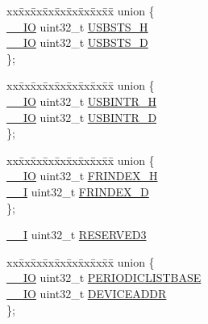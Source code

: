 \begin{DoxyCompactItemize}
\begin{tabbing}
\end{tabbing}\item 
\begin{tabbing}
xx\=xx\=xx\=xx\=xx\=xx\=xx\=xx\=xx\=\kill
union \{\\
\>\hyperlink{core__sc300_8h_aec43007d9998a0a0e01faede4133d6be}{\_\_IO} uint32\_t \hyperlink{struct_l_p_c___u_s_b_h_s___t_abebf0c674a65b6bd7e9d2f4565bcc04c}{USBSTS\_H}\\
\>\hyperlink{core__sc300_8h_aec43007d9998a0a0e01faede4133d6be}{\_\_IO} uint32\_t \hyperlink{struct_l_p_c___u_s_b_h_s___t_a0753b65b5d34850997d44e38edf3444f}{USBSTS\_D}\\
\}; \\

\end{tabbing}\item 
\begin{tabbing}
xx\=xx\=xx\=xx\=xx\=xx\=xx\=xx\=xx\=\kill
union \{\\
\>\hyperlink{core__sc300_8h_aec43007d9998a0a0e01faede4133d6be}{\_\_IO} uint32\_t \hyperlink{struct_l_p_c___u_s_b_h_s___t_a67b4a2c7b9dd79a4671688c69a348949}{USBINTR\_H}\\
\>\hyperlink{core__sc300_8h_aec43007d9998a0a0e01faede4133d6be}{\_\_IO} uint32\_t \hyperlink{struct_l_p_c___u_s_b_h_s___t_adc4b59f09357786ae059e4390b039709}{USBINTR\_D}\\
\}; \\

\end{tabbing}\item 
\begin{tabbing}
xx\=xx\=xx\=xx\=xx\=xx\=xx\=xx\=xx\=\kill
union \{\\
\>\hyperlink{core__sc300_8h_aec43007d9998a0a0e01faede4133d6be}{\_\_IO} uint32\_t \hyperlink{struct_l_p_c___u_s_b_h_s___t_aca60a62e0bc2025ddef5c46243e87a0f}{FRINDEX\_H}\\
\>\hyperlink{core__sc300_8h_af63697ed9952cc71e1225efe205f6cd3}{\_\_I} uint32\_t \hyperlink{struct_l_p_c___u_s_b_h_s___t_a8660cd5f0c2390601da8087c9e5496b1}{FRINDEX\_D}\\
\}; \\

\end{tabbing}\item 
\hyperlink{core__sc300_8h_af63697ed9952cc71e1225efe205f6cd3}{\+\_\+\+\_\+I} uint32\+\_\+t \hyperlink{struct_l_p_c___u_s_b_h_s___t_a0dccf23b0301eb78ab61f90a3e6ae594}{R\+E\+S\+E\+R\+V\+E\+D3}
\item 
\begin{tabbing}
xx\=xx\=xx\=xx\=xx\=xx\=xx\=xx\=xx\=\kill
union \{\\
\>\hyperlink{core__sc300_8h_aec43007d9998a0a0e01faede4133d6be}{\_\_IO} uint32\_t \hyperlink{struct_l_p_c___u_s_b_h_s___t_a220024dbd2ce8566ae29c4fd779bdfea}{PERIODICLISTBASE}\\
\>\hyperlink{core__sc300_8h_aec43007d9998a0a0e01faede4133d6be}{\_\_IO} uint32\_t \hyperlink{struct_l_p_c___u_s_b_h_s___t_a281cfe97943157d3dcea5f30c203d20a}{DEVICEADDR}\\
\}; \\


\end{tabbing}
\end{DoxyCompactItemize}
